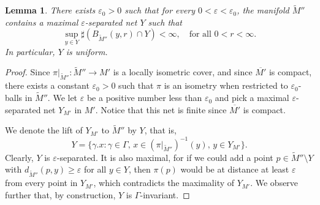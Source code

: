\documentclass[10pt,letterpaper]{amsart}
\newtheorem{lemma}[thm]{Lemma}
\theoremstyle{definition}
\numberwithin{thm}{subsection}
\numberwithin{equation}{section}
\begin{document}
\begin{lemma}\label{l:unif}
There exists $\varepsilon_0>0$ such that for every $0<\varepsilon<\varepsilon_0$, the manifold $\widetilde{M}''$ contains a maximal $\varepsilon$-separated net $Y$ such that
\begin{equation}\label{eq:UDBG}
\sup_{y\in Y} \sharp \left(B_{\widetilde{M}''}(y,r)\cap Y\right) <\infty,\quad\text{for all }0<r<\infty.
\end{equation}
In particular,  $Y$ is uniform.
\end{lemma}

\begin{proof}
Since $\pi|_{\widetilde{M}''}:\widetilde{M}''\to M'$ is a locally isometric cover, and since $\overline{M'}$ is compact, there exists a constant $\varepsilon_0>0$ such that $\pi$ is an isometry when restricted to $\varepsilon_0$-balls in $\widetilde{M}''$. We let $\varepsilon$ be a positive number less than $\varepsilon_0$ and pick a maximal $\varepsilon$-separated net $Y_{M'}$ in $M'$. Notice that this net is finite since $\overline{M'}$ is compact.

We denote the lift of $Y_{M'}$ to $\widetilde{M}''$ by $Y$, that is,
\begin{displaymath}
Y=\{\gamma . x: \gamma \in \Gamma,\, x\in (\pi|_{\widetilde{M}''})^{-1}(y),\,y\in Y_{M'}\}.
\end{displaymath}
Clearly, $Y$ is $\varepsilon$-separated. It is also maximal, for if we could add a point $p\in \widetilde{M}''\setminus Y$ with $d_{\widetilde{M}''}(p,y)\geq \varepsilon$ for all $y\in Y$, then $\pi(p)$ would be at distance at least $\varepsilon$ from every point in $Y_{M'}$, which contradicts the maximality of $Y_{M'}$. We observe further that, by construction, $Y$ is $\Gamma$-invariant.


\end{proof}
\end{document}
